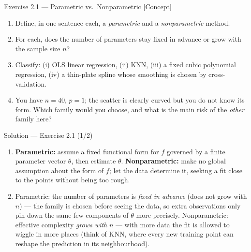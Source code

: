 \documentclass[aspectratio=169,11pt]{beamer}
\begin{document}
\begin{frame}{Exercise 2.1 --- Parametric vs.\ Nonparametric [Concept]}
\begin{exercise}
\begin{enumerate}
  \item Define, in one sentence each, a \emph{parametric} and a
        \emph{nonparametric} method.
  \item For each, does the number of parameters stay fixed in advance
        or grow with the sample size $n$?
  \item Classify: (i) OLS linear regression, (ii) KNN,
        (iii) a fixed cubic polynomial regression,
        (iv) a thin-plate spline whose smoothing is chosen by
        cross-validation.
  \item You have $n=40$, $p=1$; the scatter is clearly curved but you
        do not know its form. Which family would you choose, and what
        is the main risk of the \emph{other} family here?
\end{enumerate}
\end{exercise}
\end{frame}

\begin{frame}{Solution --- Exercise 2.1 (1/2)}
\begin{solutionbox}
\begin{enumerate}
  \item \textbf{Parametric:} assume a fixed functional form for $f$
        governed by a finite parameter vector $\theta$, then estimate
        $\theta$. \textbf{Nonparametric:} make no global assumption
        about the form of $f$; let the data determine it, seeking a
        fit close to the points without being too rough.
  \item Parametric: the number of parameters is \emph{fixed in
        advance} (does not grow with $n$) --- the family is chosen
        before seeing the data, so extra observations only pin down
        the same few components of $\theta$ more precisely.
        Nonparametric: effective complexity \emph{grows with} $n$ ---
        with more data the fit is allowed to wiggle in more places
        (think of KNN, where every new training point can reshape the
        prediction in its neighbourhood).
\end{enumerate}
\end{solutionbox}
\end{frame}
\end{document}
